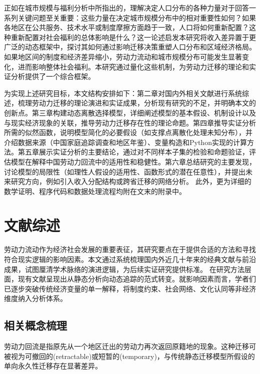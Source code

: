 \documentclass[a4paper, zihao=-4, fontset = mac, oneside]{ctexbook} %
\begin{document}
正如\textcite{desmetUrbanAccountingWelfare2013}在城市规模与福利分析中所指出的，理解决定人口分布的各种力量对于回答一系列关键问题至关重要：这些力量在决定城市规模分布中的相对重要性如何？如果各地区在公共服务、技术水平或制度摩擦方面趋于一致，人口将如何重新配置？这种重新配置对社会福利的总体影响是什么？这一论述启发本研究将收入差异置于更广泛的动态框架中，探讨其如何通过影响迁移决策重塑人口分布和区域经济格局。如果地区间的制度和经济差异缩小，劳动力流动和城市规模分布可能发生显著变化，进而影响整体社会福利。本研究通过量化这些机制，为劳动力迁移的理论和实证分析提供了一个综合框架。

为实现上述研究目标，本文结构安排如下：第二章对国内外相关文献进行系统综述，梳理劳动力迁移的理论演进和实证成果，分析现有研究的不足，并明确本文的创新点。第三章构建动态离散选择模型，详细阐述模型的基本假设、机制设计以及与现实经济现象的关联，推导劳动力迁移存在性的理论命题。第四章推导实证分析所需的似然函数，说明模型简化的必要假设（如支撑点离散化处理未知分布），并介绍数据来源（中国家庭追踪调查和地区年鉴）、变量构造和Python实现的计算方法。第五章展示实证分析的主要结论，通过对不同样本子集的检验和命题验证，评估模型在解释中国劳动力回流中的适用性和稳健性。第六章总结研究的主要发现，讨论模型的局限性（如理性人假设的适用性、函数形式的潜在任意性），并提出未来研究方向，例如引入收入分配结构或跨省迁移的网络分析。
此外，更为详细的数学证明、程序代码和数据处理流程均附在文末的附录中。



\chapter{文献综述}

劳动力流动作为经济社会发展的重要表征，其研究要点在于提供合适的方法和寻找符合现实逻辑的影响因素。本文通过系统梳理国内外近几十年来的经典文献与前沿成果，试图厘清学术脉络的演进逻辑，为后续实证研究提供标准。
在研究方法层面，现有文献呈现出从静态分析向动态追踪的范式转变。就影响因素而言，学者们已逐步突破传统经济变量的单一解释，将制度约束、社会网络、文化认同等非经济维度纳入分析体系。


\section{相关概念梳理}
劳动力回流是指原先从一个地区迁出的劳动力再次返回原籍地的现象。这种迁移可被视为可撤回的(retractable)或短暂的(temporary)，与传统静态迁移模型所假设的单向永久性迁移存在显著差异。
\end{document}
